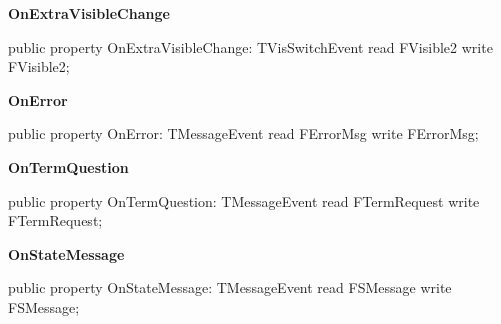\documentclass{report}
\newif\ifpdf
\begin{document}
\begin{list}{}
\begin{flushleft}
\ifpdf
\end{flushleft}
\fi


\par  \label{ipkhandle.TInstallation-OnExtraVisibleChange}
\item[\textbf{OnExtraVisibleChange}\hfill]
\ifpdf
\begin{flushleft}
\fi
\begin{ttfamily}
public property OnExtraVisibleChange: TVisSwitchEvent read FVisible2 write FVisible2;\end{ttfamily}

\ifpdf
\end{flushleft}
\fi


\par  \label{ipkhandle.TInstallation-OnError}
\item[\textbf{OnError}\hfill]
\ifpdf
\begin{flushleft}
\fi
\begin{ttfamily}
public property OnError: TMessageEvent read FErrorMsg write FErrorMsg;\end{ttfamily}

\ifpdf
\end{flushleft}
\fi


\par  \label{ipkhandle.TInstallation-OnTermQuestion}
\item[\textbf{OnTermQuestion}\hfill]
\ifpdf
\begin{flushleft}
\fi
\begin{ttfamily}
public property OnTermQuestion: TMessageEvent read FTermRequest write FTermRequest;\end{ttfamily}

\ifpdf
\end{flushleft}
\fi


\par  \label{ipkhandle.TInstallation-OnStateMessage}
\item[\textbf{OnStateMessage}\hfill]
\ifpdf
\begin{flushleft}
\fi
\begin{ttfamily}
public property OnStateMessage: TMessageEvent read FSMessage write FSMessage;\end{ttfamily}

\ifpdf
\end{flushleft}
\fi


\par  \end{list}
\end{document}

